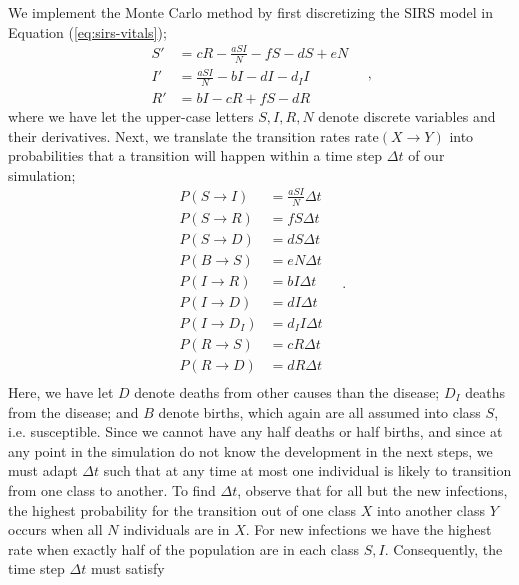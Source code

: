 \documentclass[]{article}
\begin{document}
We implement the Monte Carlo method by first discretizing the SIRS model in Equation (\ref{eq:sirs-vitals});
\begin{equation} \label{eq:sirs-vitals-discrete}
\begin{aligned}
	S' &= cR - \frac{aSI}{N} - fS - dS + eN \\
	I' &= \frac{aSI}{N} - bI - dI -d_II\\
	R' &= bI - cR + fS - dR
\end{aligned} \quad ,
\end{equation}
where we have let the upper-case letters $S,I,R,N$ denote discrete variables and their derivatives. Next, we translate the transition rates $\mathrm{rate}(X \rightarrow Y)$ into probabilities that a transition will happen within a time step $\Delta t$ of our simulation;
\begin{equation} \label{eq:transition-probabilities}
\begin{aligned}
	P(S \rightarrow I) &= \frac{aSI}{N} \Delta t \\
	P(S \rightarrow R) &= fS \Delta t \\
	P(S \rightarrow D) &= dS \Delta t \\	
	P(B \rightarrow S) &= eN \Delta t \\	
	P(I \rightarrow R) &= bI \Delta t \\	
	P(I \rightarrow D) &= dI \Delta t \\	
	P(I \rightarrow D_I) &= d_II \Delta t \\	
	P(R \rightarrow S) &= cR \Delta t \\	
	P(R \rightarrow D) &= dR \Delta t \\		
\end{aligned} \quad .
\end{equation}
Here, we have let $D$ denote deaths from other causes than the disease; $D_I$ deaths from the disease; and $B$ denote births, which again are all assumed into class $S$, i.e. susceptible. Since we cannot have any half deaths or half births, and since at any point in the simulation do not know the development in the next steps, we must adapt $\Delta t$ such that at any time at most one individual is likely to transition from one class to another. To find $\Delta t$, observe that for all but the new infections, the highest probability for the transition out of one class $X$ into another class $Y$ occurs when all $N$ individuals are in $X$. For new infections we have the highest rate when exactly half of the population are in each class $S,I$. Consequently, the time step $\Delta t$ must satisfy
\end{document}

